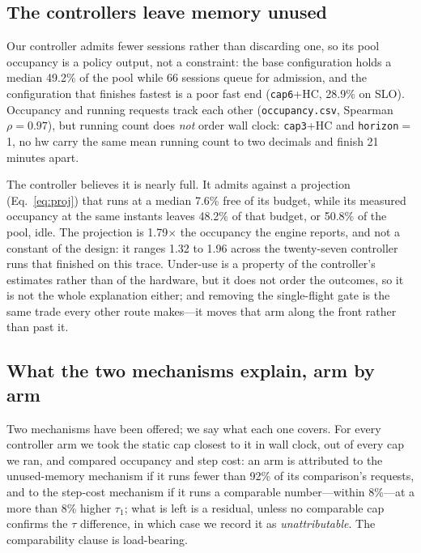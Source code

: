 \subsection{The controllers leave memory unused}
\label{sec:results:idle-memory}

Our controller admits fewer sessions rather than discarding one, so its pool
occupancy is a policy output, not a constraint: the base configuration holds a
median 49.2\% of the pool while 66 sessions queue for admission, and the
configuration that finishes fastest is a poor fast end (\texttt{cap6}+HC, 28.9\%
on SLO). Occupancy and running requests track each other (\texttt{occupancy.csv},
Spearman $\rho=0.97$), but running count does \emph{not} order wall clock:
\texttt{cap3}+HC and \texttt{horizon}$=$1, no hw carry the same mean running
count to two decimals and finish 21 minutes apart.

The controller believes it is nearly full. It admits against a projection
(Eq.~\ref{eq:proj}) that runs at a median 7.6\% free of its budget, while
its measured occupancy at the same instants leaves 48.2\% of that budget, or
50.8\% of the pool, idle. The projection is 1.79$\times$ the occupancy the engine
reports, and not a constant of the design: it ranges 1.32 to 1.96 across the
twenty-seven controller runs that finished on this trace. Under-use is a property of the
controller's estimates rather than of the hardware, but it does not order the
outcomes, so it is not the whole explanation either; and removing the
single-flight gate is the same trade every other route makes---it moves that arm
along the front rather than past it.

\subsection{What the two mechanisms explain, arm by arm}
\label{sec:results:attribution}

Two mechanisms have been offered; we say what each one covers. For every
controller arm we took the static cap closest to it in wall
clock, out of every cap we ran, and compared occupancy and step cost: an arm is
attributed to the unused-memory mechanism if it runs fewer than 92\% of its
comparison's requests, and to the step-cost mechanism if it runs a comparable
number---within 8\%---at a more than 8\% higher $\tau_1$; what is left is a residual,
unless no comparable cap confirms the $\tau$ difference, in which case we record it as
\emph{unattributable}. The comparability clause is load-bearing.


